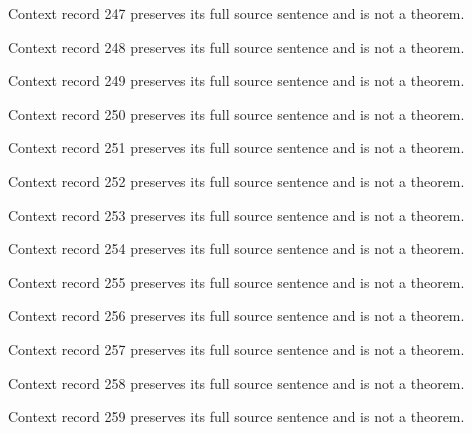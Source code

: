 \documentclass{article}
\begin{document}
\begin{remark}\label{train:context:247}Context record 247 preserves its full source sentence and is not a theorem.\end{remark}
\begin{remark}\label{train:context:248}Context record 248 preserves its full source sentence and is not a theorem.\end{remark}
\begin{remark}\label{train:context:249}Context record 249 preserves its full source sentence and is not a theorem.\end{remark}
\begin{remark}\label{train:context:250}Context record 250 preserves its full source sentence and is not a theorem.\end{remark}
\begin{remark}\label{train:context:251}Context record 251 preserves its full source sentence and is not a theorem.\end{remark}
\begin{remark}\label{train:context:252}Context record 252 preserves its full source sentence and is not a theorem.\end{remark}
\begin{remark}\label{train:context:253}Context record 253 preserves its full source sentence and is not a theorem.\end{remark}
\begin{remark}\label{train:context:254}Context record 254 preserves its full source sentence and is not a theorem.\end{remark}
\begin{remark}\label{train:context:255}Context record 255 preserves its full source sentence and is not a theorem.\end{remark}
\begin{remark}\label{train:context:256}Context record 256 preserves its full source sentence and is not a theorem.\end{remark}
\begin{remark}\label{train:context:257}Context record 257 preserves its full source sentence and is not a theorem.\end{remark}
\begin{remark}\label{train:context:258}Context record 258 preserves its full source sentence and is not a theorem.\end{remark}
\begin{remark}\label{train:context:259}Context record 259 preserves its full source sentence and is not a theorem.\end{remark}
\end{document}

